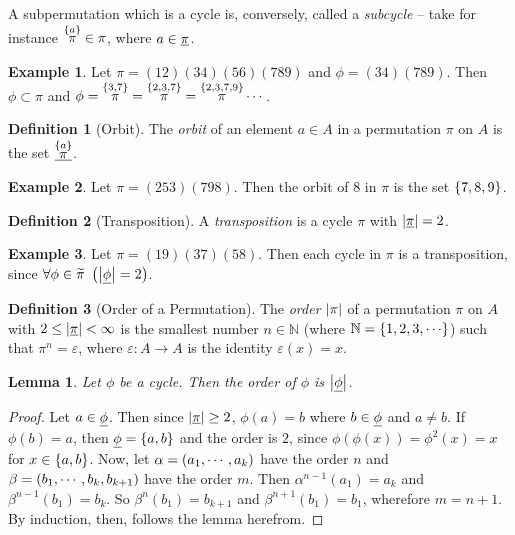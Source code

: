 \documentclass[a4paper,twoside,12pt,openany]{report}
\theoremstyle{plain}
\newtheorem{lemma}{Lemma}
\theoremstyle{definition}
\newtheorem{definition}{Definition}
\newtheorem{example}{Example}
\theoremstyle{remark}
\begin{document}
A subpermutation which is a cycle is, conversely, called a \textit{subcycle} -- take for instance \(\overset{\left\{ a \right\}}{\pi} \in \pi\), where \(a\in\underline{\pi}\).

\begin{example}
	Let \(\pi = (12)(34)(56)(789)\) and \(\phi = (34)(789)\). Then \(\phi\subset\pi\) and \(\phi=\overset{\left\{ 3,7 \right\}}{\pi}=\overset{\left\{ 2,3,7 \right\}}{\pi}=\overset{\left\{ 2,3,7,9 \right\}}{\pi}\cdots\).
\end{example}

\begin{definition}[Orbit]
	The \emph{orbit} of an element \(a\in A\) in a permutation \(\pi\) on \(A\) is the set \(\underline{\overset{\left\{ a \right\}}{\pi}}\).
\end{definition}

\begin{example}
	Let \(\pi = (253)(798)\). Then the orbit of \(8\) in \(\pi\) is the set \(\left\{ 7,8,9 \right\}\).
\end{example}

\begin{definition}[Transposition]
	A \emph{transposition} is a cycle \(\pi\) with \(\left|\underline{\pi}\right|=2\).
\end{definition}

\begin{example}
	Let \(\pi = (19)(37)(58)\). Then each cycle in \(\pi\) is a transposition, since \(\forall \phi\in\widetilde{\pi}\ \left(\left|\underline{\phi}\right|=2\right)\).
\end{example}

\begin{definition}[Order of a Permutation]
	The \emph{order} \(\left|\pi\right|\) of a permutation \(\pi\) on \(A\) with \(2\leq\left|\underline{\pi}\right|<\infty\) is the smallest number \(n\in\mathbb{N}\) (where \(\mathbb{N}=\set{1,2,3,\cdots}\)) such that \(\pi^n = \varepsilon\), where \(\varepsilon:A\to A\) is the identity \(\varepsilon(x)=x\).
\end{definition}

\begin{lemma}
	Let \(\phi\) be a cycle. Then the order of \(\phi\) is \(\left|\underline{\phi}\right|\).
\end{lemma}

\begin{proof}
	Let \(a\in\underline{\phi}\).
	Then since \(\left|\underline{\pi}\right|\geq 2\), \(\phi(a)=b\) where \(b\in \underline{\phi}\) and \(a\neq b\). If \(\phi(b) = a\), then \(\underline{\phi}=\left\{ a,b \right\}\) and the order is \(2\), since \(\phi(\phi(x))=\phi^2(x)=x\) for \(x\in\left\{ a,b \right\}\). Now, let \(\alpha = \left( a_1,\cdots,a_k \right)\) have the order \(n\) and \(\beta=\left( b_1,\cdots,b_k,b_{k+1} \right)\) have the order \(m\). Then \(\alpha^{n-1}(a_1)=a_{k}\) and \(\beta^{n-1}(b_1)=b_{k}\). So \(\beta^{n}(b_1)=b_{k+1}\) and \(\beta^{n+1}(b_1)=b_1\), wherefore \(m = n+1\). By induction, then, follows the lemma herefrom.
\end{proof}
\end{document}
